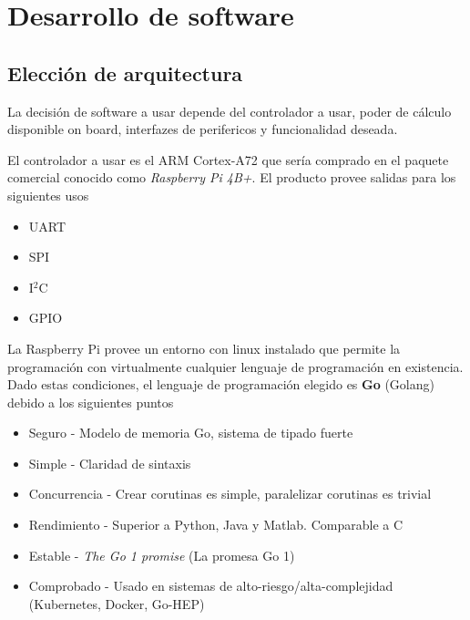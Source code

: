 \section{Desarrollo de software}

\subsection{Elección de arquitectura}
La decisión de software a usar depende del controlador a usar, poder de cálculo disponible on board, interfazes de perifericos y funcionalidad deseada.

El controlador a usar es el ARM Cortex-A72 que sería comprado en el paquete comercial conocido como \textit{Raspberry Pi 4B+}. El producto provee salidas para los siguientes usos

\begin{itemize}
    \item UART
    \item SPI
    \item I$^2$C
    \item GPIO
\end{itemize}

La Raspberry Pi provee un entorno con linux instalado que permite la programación con virtualmente cualquier lenguaje de programación en existencia. Dado estas condiciones, el lenguaje de programación elegido es \textbf{Go} (Golang) debido a los siguientes puntos

\begin{itemize}
    \item Seguro - Modelo de memoria Go, sistema de tipado fuerte
    \item Simple - Claridad de sintaxis
    \item Concurrencia - Crear corutinas es simple, paralelizar corutinas es trivial
    \item Rendimiento - Superior a Python, Java y Matlab. Comparable a C
    \item Estable - \textit{The Go 1 promise} (La promesa Go 1)
    \item Comprobado -  Usado en sistemas de alto-riesgo/alta-complejidad (Kubernetes, Docker, Go-HEP)
\end{itemize}
\clearpage
